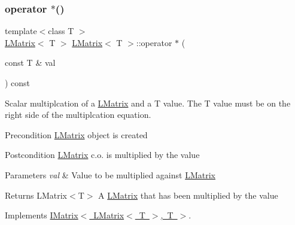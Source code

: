 \mbox{\label{class_l_matrix_ac8df9082c434b41a98d26defb95ea388}} 
\subsubsection{\texorpdfstring{operator $\ast$()}{operator *()}}
{\footnotesize\ttfamily template$<$class T $>$ \\
\mbox{\hyperlink{class_l_matrix}{L\+Matrix}}$<$ T $>$ \mbox{\hyperlink{class_l_matrix}{L\+Matrix}}$<$ T $>$\+::operator $\ast$ (\begin{DoxyParamCaption}\item[{const T \&}]{val }\end{DoxyParamCaption}) const\hspace{0.3cm}{\ttfamily [virtual]}}



Scalar multiplcation of a \mbox{\hyperlink{class_l_matrix}{L\+Matrix}} and a T value. The T value must be on the right side of the multiplcation equation. 

\begin{DoxyPrecond}{Precondition}
\mbox{\hyperlink{class_l_matrix}{L\+Matrix}} object is created 
\end{DoxyPrecond}
\begin{DoxyPostcond}{Postcondition}
\mbox{\hyperlink{class_l_matrix}{L\+Matrix}} c.\+o. is multiplied by the value 
\end{DoxyPostcond}

\begin{DoxyParams}{Parameters}
{\em val} & Value to be multiplied against \mbox{\hyperlink{class_l_matrix}{L\+Matrix}} \\
\hline
\end{DoxyParams}
\begin{DoxyReturn}{Returns}
L\+Matrix$<$\+T$>$ A \mbox{\hyperlink{class_l_matrix}{L\+Matrix}} that has been multiplied by the value 
\end{DoxyReturn}


Implements \mbox{\hyperlink{class_i_matrix_a10121e038635bdf33552c6a1fb288398}{I\+Matrix$<$ L\+Matrix$<$ T $>$, T $>$}}.

\mbox{\label{class_l_matrix_aa0b1bc37d56538dbdd4fcb3b88dcc3ec}} 

